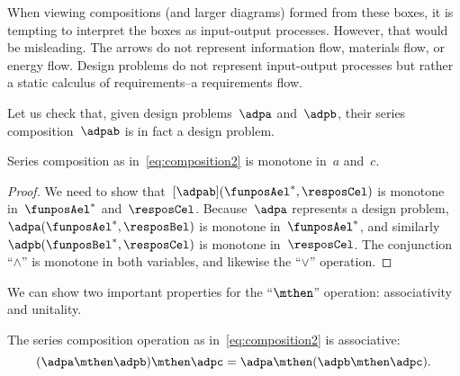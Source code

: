 \begin{remark}
    When viewing compositions (and larger diagrams) formed from these boxes, it is tempting to interpret the boxes as input-output processes.
    However, that would be misleading. The arrows do not represent information flow, materials flow, or energy flow.
    Design problems do not represent input-output processes but rather a static calculus of requirements--a requirements flow.
\end{remark}

Let us check that, given design problems~$\adpa$ and~$\adpb$, their series composition~$\adpab$ is in fact a design problem.
\begin{lemma}
    Series composition as in~\cref{eq:composition2} is monotone in~$a$ and~$c$.
\end{lemma}
\begin{proof}
    We need to show that~$[\adpab](\funposAel^*,\resposCel)$ is monotone in~$\funposAel^*$ and~$\resposCel$.
    Because~$\adpa$ represents a design problem,~$\adpa(\funposAel^*,\resposBel)$ is monotone in~$\funposAel^*$, and similarly~$\adpb(\funposBel^*,\resposCel)$ is monotone in~$\resposCel$.
    The conjunction ``$\wedge$'' is monotone in both variables, and likewise the ``$\vee$'' operation.
\end{proof}

We can show two important properties for the ``$\mthen$'' operation: associativity and unitality.
\begin{lemma}
    The series composition operation as in~\cref{eq:composition2} is associative:
    \begin{equation}
    (\adpa\mthen \adpb)
        \mthen \adpc = \adpa\mthen (\adpb\mthen \adpc).
    \end{equation}
\end{lemma}


